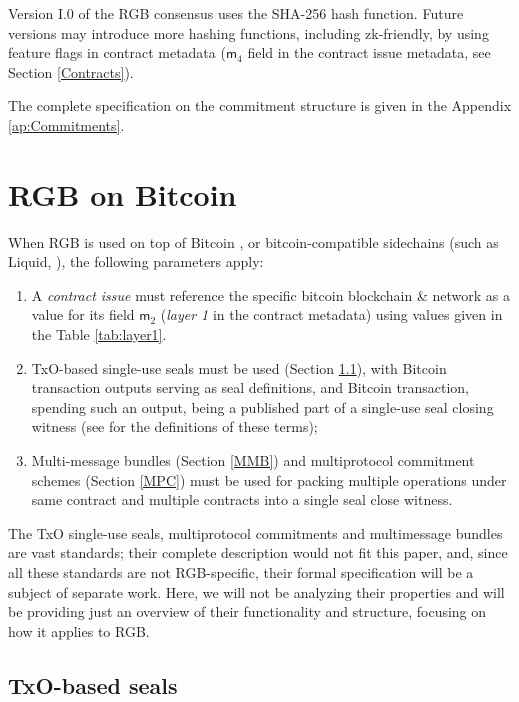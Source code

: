 \documentclass[9pt,oneside]{amsart}
\begin{document}
\begin{multicols}{2}
Version I.0 of the RGB consensus uses the SHA-256 hash function.
Future versions may introduce more hashing functions, including zk-friendly,
by using feature flags in contract metadata
($\mathsf{m}_4$ field in the contract issue metadata, see Section \ref{Contracts}).

The complete specification on the commitment structure is given in the Appendix \ref{ap:Commitments}.

\section{RGB on Bitcoin}

When RGB is used on top of Bitcoin \cite{Bitcoin},
or bitcoin-compatible sidechains (such as Liquid, \cite{Liquid}),
the following parameters apply:

\begin{enumerate}
\item A \emph{contract issue} must reference the specific bitcoin blockchain \& network
  as a value for its field $\mathsf{m}_2$ (\emph{layer 1} in the contract metadata)
  using values given in the Table \ref{tab:layer1}.
\item TxO-based single-use seals must be used (Section \ref{Seals}),
  with Bitcoin transaction outputs serving as seal definitions,
  and Bitcoin transaction, spending such an output,
  being a published part of a single-use seal closing witness
  (see \cite{LNPBP8} for the definitions of these terms);
\item Multi-message bundles (Section \ref{MMB})
  and multiprotocol commitment schemes (Section \ref{MPC}) must be used for packing
  multiple operations under same contract and multiple contracts
  into a single \gls{seal close witness}.
\end{enumerate}

The TxO single-use seals, multiprotocol commitments and multimessage bundles are vast standards;
their complete description would not fit this paper, and,
since all these standards are not RGB-specific,
their formal specification will be a subject of separate work.
Here, we will not be analyzing their properties and will be providing just an overview
of their functionality and structure, focusing on how it applies to RGB.

\subsection{TxO-based seals}\label{Seals}


\end{multicols}
\end{document}
